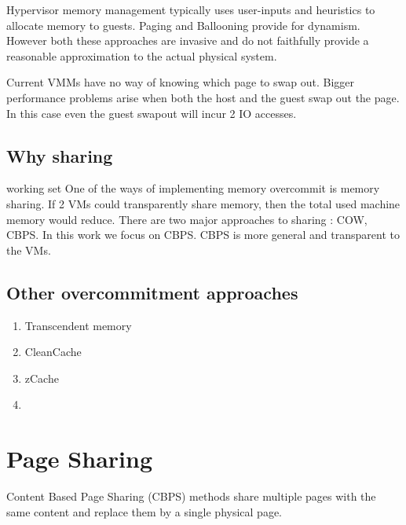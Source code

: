 \documentclass[10pt,a4paper]{article}
\begin{document}
Hypervisor memory management typically uses user-inputs and heuristics to allocate memory to guests. Paging and Ballooning provide for dynamism. However both these approaches are invasive and do not faithfully provide a reasonable approximation to the actual physical system.

Current VMMs have no way of knowing which page to swap out. Bigger performance problems arise when both the host and the guest swap out the page. In this case even the guest swapout will incur 2 IO accesses.
  


\subsection{Why sharing}

working set
One of the ways of implementing memory overcommit is memory sharing. If 2 VMs could transparently share memory, then the total used machine memory would reduce.
There are two major approaches to sharing : COW, CBPS. 
In this work we focus on CBPS. CBPS is more general and transparent to the VMs. 

\subsection{Other overcommitment approaches}

\begin{enumerate}
\item Transcendent memory
\item CleanCache
\item zCache
\item 
\end{enumerate}

\section{Page Sharing}
Content Based Page Sharing (CBPS) methods share multiple pages with the same content and replace them by a single physical page.
\end{document}

